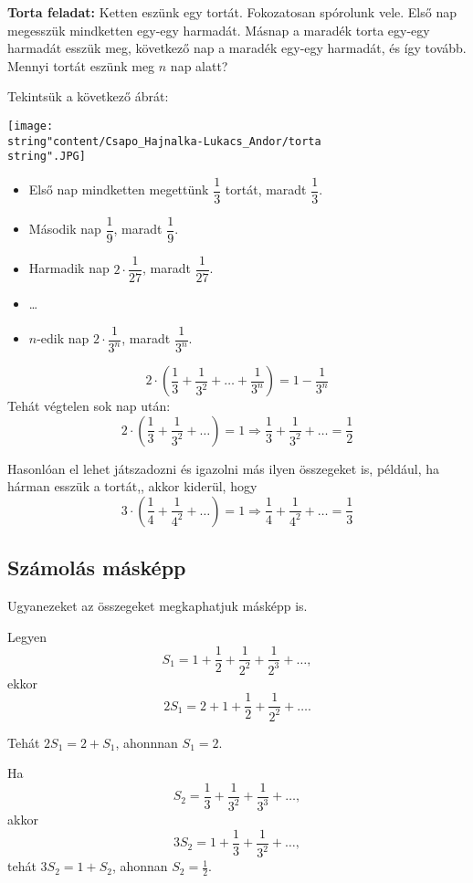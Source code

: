 \begin{problem}\textbf{Torta feladat:} Ketten eszünk egy tortát. Fokozatosan spórolunk vele. Első nap megesszük
mindketten egy-egy harmadát. Másnap a maradék torta egy-egy harmadát
esszük meg, következő nap a maradék egy-egy harmadát, és így tovább.
Mennyi tortát eszünk meg $n$ nap alatt?
\end{problem}
\begin{solution}
	Tekintsük a következő ábrát:
\begin{center}
	\texttt{[image: \\string"content/Csapo\_Hajnalka-Lukacs\_Andor/torta\\string".JPG]}
\end{center}

\begin{itemize}
	\item Első nap mindketten megettünk $\dfrac{1}{3}$ tortát, maradt $\dfrac{1}{3}$.
	\item Második nap $\dfrac{1}{9}$, maradt $\dfrac{1}{9}$.
	\item Harmadik nap $2\cdot\dfrac{1}{27}$, maradt $\dfrac{1}{27}$.
	\item \ldots
	\item $n$-edik nap $2\cdot\dfrac{1}{3^{n}}$, maradt $\dfrac{1}{3^{n}}$.
\end{itemize}
\[
2\cdot\left(\dfrac{1}{3}+\dfrac{1}{3^{2}}+\dots+\dfrac{1}{3^{n}}\right)=1-\dfrac{1}{3^{n}}
\]
Tehát végtelen sok nap után: 
\[
2\cdot\left(\dfrac{1}{3}+\dfrac{1}{3^{2}}+\dots\right)=1\Rightarrow\dfrac{1}{3}+\dfrac{1}{3^{2}}+\dots=\dfrac{1}{2}
\]

Hasonlóan el lehet játszadozni és igazolni más ilyen összegeket is,
például, ha hárman esszük a tortát,, akkor kiderül, hogy 
\[
3\cdot\left(\dfrac{1}{4}+\dfrac{1}{4^{2}}+\dots\right)=1\Rightarrow\dfrac{1}{4}+\dfrac{1}{4^{2}}+\dots=\dfrac{1}{3}
\]
\end{solution}

\subsection*{Számolás másképp}

Ugyanezeket az összegeket megkaphatjuk másképp is.

Legyen 
\[
S_{1}=1+\dfrac{1}{2}+\dfrac{1}{2^{2}}+\dfrac{1}{2^{3}}+\dots,
\]
ekkor 
\[
2S_{1}=2+1+\dfrac{1}{2}+\dfrac{1}{2^{2}}+\dots.
\]

Tehát $2S_{1}=2+S_{1}$, ahonnnan $S_{1}=2$.

Ha 
\[
S_{2}=\dfrac{1}{3}+\dfrac{1}{3^{2}}+\dfrac{1}{3^{3}}+\dots,
\]
akkor 
\[
3S_{2}=1+\dfrac{1}{3}+\dfrac{1}{3^{2}}+\dots,
\]
tehát $3S_{2}=1+S_{2}$, ahonnan $S_{2}=\frac{1}{2}.$

